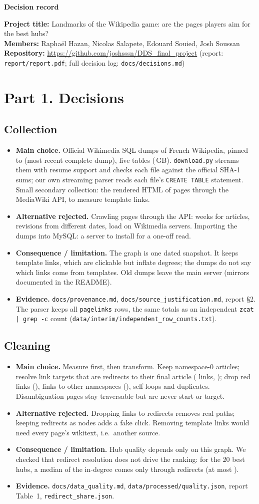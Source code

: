 \documentclass[10pt,a4paper]{article}
\newcommand{\stage}[5]{\subsection*{#1}
\begin{itemize}
\item \textbf{Main choice.} #2
\item \textbf{Alternative rejected.} #3
\item \textbf{Consequence / limitation.} #4
\item \textbf{Evidence.} #5
\end{itemize}}
\begin{document}
{\Large\bfseries Decision record}\par\smallskip
\textbf{Project title:} Landmarks of the Wikipedia game: are the pages players aim for the best hubs?\\
\textbf{Members:} Raphaël Hazan, Nicolas Salapete, Edouard Souied, Josh Soussan\\
\textbf{Repository:} \url{https://github.com/joshsssn/DDS_final_project}
(report: \texttt{report/report.pdf}; full decision log: \texttt{docs/decisions.md})

\section*{Part 1. Decisions}

\stage{Collection}
{Official Wikimedia SQL dumps of French Wikipedia, pinned to \DumpDate{} (most recent complete
dump), five tables (\RawGB\,GB). \texttt{download.py} streams them with resume support and checks
each file against the official SHA-1 sums; our own streaming parser reads each file's
\texttt{CREATE TABLE} statement. Small secondary collection: the rendered HTML of \BiasNPages{}
pages through the MediaWiki API, to measure template links.}
{Crawling pages through the API: weeks for \NArticles{} articles, revisions from different
dates, load on Wikimedia servers. Importing the dumps into MySQL: a server to install for a
one-off read.}
{The graph is one dated snapshot. It keeps template links, which are clickable but inflate
degrees; the dumps do not say which links come from templates. Old dumps leave the main server
(mirrors documented in the README).}
{\texttt{docs/provenance.md}, \texttt{docs/source\_justification.md}, report §2. The parser
keeps all \NLinkRows{} \texttt{pagelinks} rows, the same totals as an independent
\texttt{zcat | grep -c} count (\texttt{data/interim/independent\_row\_counts.txt}).}

\stage{Cleaning}
{Measure first, then transform. Keep namespace-0 articles; resolve link targets that are
redirects to their final article (\NLinksViaRedirect{} links, \ShareLinksViaRedirect); drop red
links (\ShareRedLinks), links to other namespaces (\ShareLinksOtherNs), self-loops and duplicates.
Disambiguation pages stay traversable but are never start or target.}
{Dropping links to redirects removes real paths; keeping redirects as nodes adds a fake click.
Removing template links would need every page's wikitext, i.e.\ another source.}
{Hub quality depends only on this graph. We checked that redirect resolution does not drive the
ranking: for the 20 best hubs, a median \RedirTopMedShare{} of the in-degree comes only through
redirects (at most \RedirTopMaxShare).}
{\texttt{docs/data\_quality.md}, \texttt{data/processed/quality.json}, report Table~1,
\texttt{redirect\_share.json}.}
\end{document}
